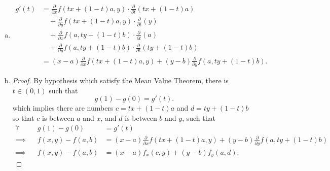 \begin{Exercise}
\begin{enumerate}[a)]
\item
\begin{solution}
\begin{align*}
g'(t)
&= \frac{\partial}{\partial x}f(t x+(1-t)a, y)\cdot\frac{\partial}{\partial t}(t x+(1-t)a) \\
&\quad +\frac{\partial}{\partial y}f(t x+(1-t)a,y)\cdot\frac{\partial}{\partial t}(y) \\
&\quad +\frac{\partial}{\partial x}f(a, t y+(1-t)b)\cdot\frac{\partial}{\partial t}(a) \\
&\quad +\frac{\partial}{\partial y}f(a, t y+(1-t)b)\cdot\frac{\partial}{\partial t}(t y+(1-t)b) \\
&= (x-a)\frac{\partial}{\partial x}f(t x+(1-t)a,y) + (y-b)\frac{\partial}{\partial y}f(a,t y+(1-t)b).
\end{align*}
\end{solution}

\item
\begin{proof}
By hypothesis which satisfy the Mean Value Theorem, there is $t\in(0,1)$ such that
$$
g(1)-g(0) = g'(t).
$$
which implies there are numbers $c=t x+(1-t)a$ and $d=t y+(1-t)b$ so that $c$ is between $a$ and $x$, and $d$ is between $b$ and $y$, such that
\begin{alignat*}{7}
\quad&& g(1)-g(0) &= g'(t) \\
\implies&& f(x,y)-f(a,b) &= (x-a)\frac{\partial}{\partial x}f(t x+(1-t)a,y) + (y-b)\frac{\partial}{\partial y}f(a,t y+(1-t)b) \\
\implies&& f(x,y)-f(a,b) &= (x-a)f_x(c,y)+(y-b)f_y(a,d).
\end{alignat*}
\end{proof}
\end{enumerate}
\end{Exercise}